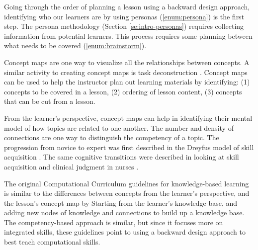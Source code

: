 \documentclass[010-intro.tex]{subfiles}
\begin{document}
        Going through the order of planning a lesson using a backward design approach,
        identifying who our learners are by using personas (\ref{enum:persona}) is the first step.
        The persona methodology (Section \ref{se:intro-personas}) requires collecting information from potential
        learners.
        This process requires some planning between what needs to be covered (\ref{enum:brainstorm}).

        Concept maps are one way to visualize all the relationships between concepts.
        A similar activity to creating concept maps is task deconstruction
        \cite{Koch2016}.
        Concept maps can be used to
        help the instructor plan out learning materials by identifying:
        (1) concepts to be covered in a lesson,
        (2) ordering of lesson content,
        (3) concepts that can be cut from a lesson.

        From the learner's perspective, concept maps can help in identifying their mental model of how topics
        are related to one another.
        The number and density of connections are one way to distinguish the competency of a topic.
        The progression from novice to expert was first described in the Dreyfus model of skill acquisition
        \cite{dreyfus1980five, bennerUsingDreyfusModel2004}.
        The same cognitive transitions were described in looking at skill acquisition and clinical judgment in nurses
        \cite{bennerUsingDreyfusModel2004}.

        The original Computational Curriculum guidelines for knowledge-based learning is similar
        to the differences between concepts from the learner's perspective, and the lesson's concept map
        by Starting from the learner's knowledge base, and adding new nodes of knowledge and connections to build up a knowledge base.
        The competency-based approach is similar, but since it focuses more on integrated skills,
        these guidelines point to using a backward design approach to best teach computational skills.
\end{document}
